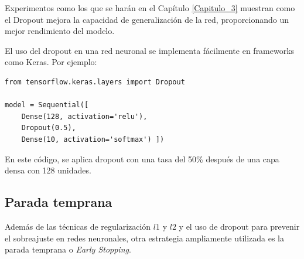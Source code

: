 Experimentos como los que se harán en el Capítulo \ref{Capitulo_3} muestran como el Dropout mejora la capacidad de generalización de la red, proporcionando un mejor rendimiento del modelo.


El uso del dropout en una red neuronal se implementa fácilmente en frameworks como Keras. Por ejemplo:

\lstset{language=Python}
\begin{lstlisting}
from tensorflow.keras.layers import Dropout

model = Sequential([
    Dense(128, activation='relu'),
    Dropout(0.5),
    Dense(10, activation='softmax') ])
\end{lstlisting}

En este código, se aplica dropout con una tasa del 50\% después de una capa densa con 128 unidades.



\subsection{Parada temprana}

Además de las técnicas de regularización $l1$ y $l2$ y el uso de dropout para prevenir el sobreajuste en redes neuronales, otra estrategia ampliamente utilizada es la parada temprana o \textit{Early Stopping}.

